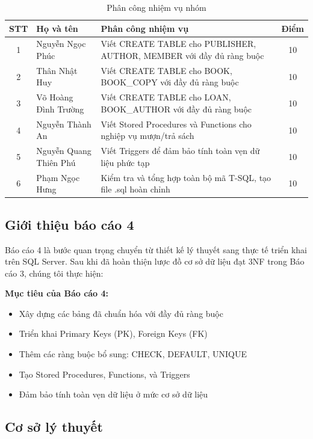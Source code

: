 \documentclass[12pt,a4paper]{article}
\begin{document}
\begin{table}[H]
\centering
\caption{Phân công nhiệm vụ nhóm}
\begin{tabular}{@{}|c|l|p{8cm}|c|@{}}
\hline
\textbf{STT} & \textbf{Họ và tên} & \textbf{Phân công nhiệm vụ} & \textbf{Điểm} \\ \hline
1 & Nguyễn Ngọc Phúc &
Viết CREATE TABLE cho PUBLISHER, AUTHOR, MEMBER với đầy đủ ràng buộc &
10 \\ \hline
2 & Thân Nhật Huy &
Viết CREATE TABLE cho BOOK, BOOK\_COPY với đầy đủ ràng buộc &
10 \\ \hline
3 & Võ Hoàng Đình Trường &
Viết CREATE TABLE cho LOAN, BOOK\_AUTHOR với đầy đủ ràng buộc &
10 \\ \hline
4 & Nguyễn Thành An &
Viết Stored Procedures và Functions cho nghiệp vụ mượn/trả sách &
10 \\ \hline
5 & Nguyễn Quang Thiên Phú &
Viết Triggers để đảm bảo tính toàn vẹn dữ liệu phức tạp &
10 \\ \hline
6 & Phạm Ngọc Hưng &
Kiểm tra và tổng hợp toàn bộ mã T-SQL, tạo file .sql hoàn chỉnh &
10 \\ \hline
\end{tabular}
\end{table}

\subsection{Giới thiệu báo cáo 4}

Báo cáo 4 là bước quan trọng chuyển từ thiết kế lý thuyết sang thực tế triển khai trên SQL Server. Sau khi đã hoàn thiện lược đồ cơ sở dữ liệu đạt 3NF trong Báo cáo 3, chúng tôi thực hiện:

\textbf{Mục tiêu của Báo cáo 4:}
\begin{itemize}
    \item Xây dựng các bảng đã chuẩn hóa với đầy đủ ràng buộc
    \item Triển khai Primary Keys (PK), Foreign Keys (FK)
    \item Thêm các ràng buộc bổ sung: CHECK, DEFAULT, UNIQUE
    \item Tạo Stored Procedures, Functions, và Triggers
    \item Đảm bảo tính toàn vẹn dữ liệu ở mức cơ sở dữ liệu
\end{itemize}

\subsection{Cơ sở lý thuyết}
\end{document}
